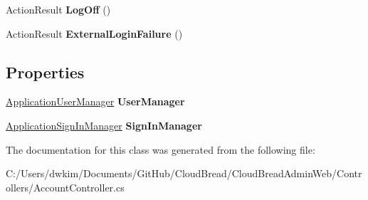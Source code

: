 \begin{DoxyCompactItemize}
\item 
Action\+Result {\bfseries Log\+Off} ()\hypertarget{a00007_a5fd1abcf376de86b70209e770cbb5bca}{}\label{a00007_a5fd1abcf376de86b70209e770cbb5bca}

\item 
Action\+Result {\bfseries External\+Login\+Failure} ()\hypertarget{a00007_a4553fc1091db8e6a23cf05a80beca438}{}\label{a00007_a4553fc1091db8e6a23cf05a80beca438}

\end{DoxyCompactItemize}
\subsection*{Properties}
\begin{DoxyCompactItemize}
\item 
\hyperlink{a00019}{Application\+User\+Manager} {\bfseries User\+Manager}\hypertarget{a00007_a6afd7b8108ddbf88909d4d7d85f22e7d}{}\label{a00007_a6afd7b8108ddbf88909d4d7d85f22e7d}

\item 
\hyperlink{a00017}{Application\+Sign\+In\+Manager} {\bfseries Sign\+In\+Manager}\hypertarget{a00007_af6e2b39dcd4e452ffafac3b7b11dfe13}{}\label{a00007_af6e2b39dcd4e452ffafac3b7b11dfe13}

\end{DoxyCompactItemize}


The documentation for this class was generated from the following file\+:\begin{DoxyCompactItemize}
\item 
C\+:/\+Users/dwkim/\+Documents/\+Git\+Hub/\+Cloud\+Bread/\+Cloud\+Bread\+Admin\+Web/\+Controllers/Account\+Controller.\+cs\end{DoxyCompactItemize}

